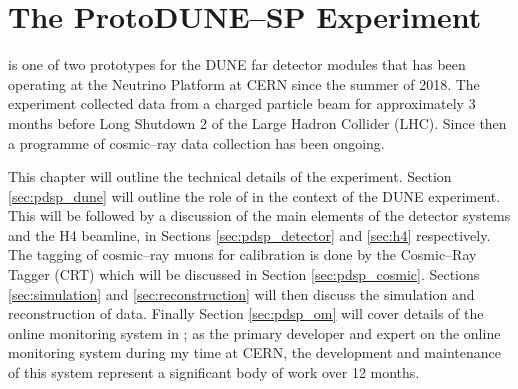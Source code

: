 \chapter{\label{ch:protodune}The ProtoDUNE--SP Experiment} 

%
% 

\minitoc

\protodune{} is one of two prototypes for the DUNE far detector modules that has
been operating at the Neutrino Platform at CERN since the summer of 2018. The
experiment collected data from a charged particle beam for approximately 3 
months before Long Shutdown 2 of the Large Hadron Collider (LHC). Since then a 
programme of cosmic--ray data collection has been ongoing.

This chapter will outline the technical details of the \protodune{} experiment.
Section \ref{sec:pdsp_dune} will outline the role of \protodune{} in the context
of the DUNE experiment. This will be followed by a discussion of the main
elements of the \protodune{} detector systems and the H4 beamline, in Sections 
\ref{sec:pdsp_detector} and \ref{sec:h4} respectively. The tagging of 
cosmic--ray muons for calibration is done by the Cosmic--Ray Tagger (CRT) which will 
be discussed in Section \ref{sec:pdsp_cosmic}. Sections \ref{sec:simulation} 
and \ref{sec:reconstruction} will then discuss the simulation and 
reconstruction of \protodune{} data. Finally Section \ref{sec:pdsp_om} will 
cover details of the online monitoring system in \protodune{}; as the primary 
developer and expert on the \protodune{} online monitoring system during my 
time at CERN, the development and maintenance of this system represent a 
significant body of work over 12 months.  

